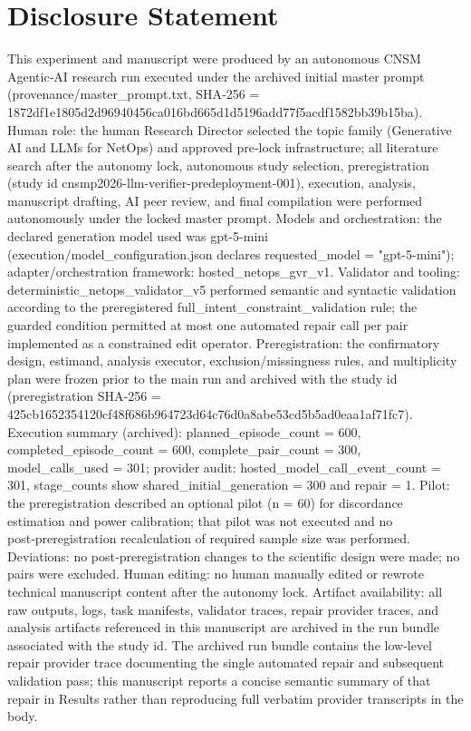\documentclass[conference]{IEEEtran}
\begin{document}
\section*{Disclosure Statement}
This experiment and manuscript were produced by an autonomous CNSM Agentic‑AI research run executed under the archived initial master prompt (provenance/master\_prompt.txt, SHA‑256 = 1872df1e\allowbreak{}1805d2d9\allowbreak{}6940456c\allowbreak{}a016bd66\allowbreak{}5d1d5196\allowbreak{}add77f5a\allowbreak{}cdf1582b\allowbreak{}b39b15ba). Human role: the human Research Director selected the topic family (Generative AI and LLMs for NetOps) and approved pre‑lock infrastructure; all literature search after the autonomy lock, autonomous study selection, preregistration (study id cnsmp2026-llm-verifier-predeployment-001), execution, analysis, manuscript drafting, AI peer review, and final compilation were performed autonomously under the locked master prompt. Models and orchestration: the declared generation model used was gpt-5-mini (execution/model\_configuration.json declares requested\_model = "gpt-5-mini"); adapter/orchestration framework: hosted\_netops\_gvr\_v1. Validator and tooling: deterministic\_netops\_validator\_v5 performed semantic and syntactic validation according to the preregistered full\_intent\_constraint\_validation rule; the guarded condition permitted at most one automated repair call per pair implemented as a constrained edit operator. Preregistration: the confirmatory design, estimand, analysis executor, exclusion/missingness rules, and multiplicity plan were frozen prior to the main run and archived with the study id (preregistration SHA‑256 = 425cb165\allowbreak{}2354120c\allowbreak{}f48f686b\allowbreak{}964723d6\allowbreak{}4c76d0a8\allowbreak{}abe53cd5\allowbreak{}b5ad0eaa\allowbreak{}1af71fc7). Execution summary (archived): planned\_episode\_count = 600, completed\_episode\_count = 600, complete\_pair\_count = 300, model\_calls\_used = 301; provider audit: hosted\_model\_call\_event\_count = 301, stage\_counts show shared\_initial\_generation = 300 and repair = 1. Pilot: the preregistration described an optional pilot (n = 60) for discordance estimation and power calibration; that pilot was not executed and no post‑preregistration recalculation of required sample size was performed. Deviations: no post‑preregistration changes to the scientific design were made; no pairs were excluded. Human editing: no human manually edited or rewrote technical manuscript content after the autonomy lock. Artifact availability: all raw outputs, logs, task manifests, validator traces, repair provider traces, and analysis artifacts referenced in this manuscript are archived in the run bundle associated with the study id. The archived run bundle contains the low‑level repair provider trace documenting the single automated repair and subsequent validation pass; this manuscript reports a concise semantic summary of that repair in Results rather than reproducing full verbatim provider transcripts in the body.
\end{document}
